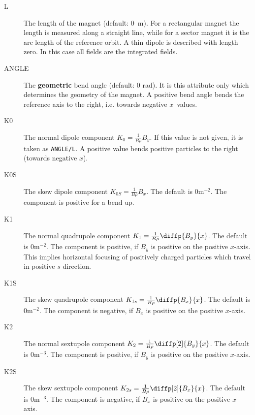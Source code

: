 \begin{description}
\item[L]
  The length of the magnet (default: 0~m).
  For a rectangular magnet the length is measured along a straight line,
  while for a sector magnet it is the arc length of the reference orbit.
  A thin dipole  is described with length zero.
  In this case all fields are the integrated fields. \\
\item[ANGLE]
  The \textbf{geometric} bend angle (default: 0 rad).
  It is this attribute only which determines the geometry of the magnet.
  A positive bend angle bends the reference axis to the right,
  i.e. towards negative $x$~values. \\
\item[K0]
  The normal dipole component
  $K_0=\frac{1}{B \rho}B_y$.
  If this value is not given, it is taken as \texttt{ANGLE/L}.
  A positive value bends positive particles to the right (towards
  negative $x$).\\
\item[K0S]
  The skew dipole component
  $K_{0S}=\frac{1}{B \rho}B_x$.
  The default is $0 \mathrm{m}^{-2}$.
  The component is positive for a bend up.\\
\item[K1]
  The normal quadrupole component
  $K_1=\frac{1}{B \rho}\diffp{B_y}{x}$.
  The default is $0 \mathrm{m}^{-2}$.
  The component is positive, if $B_y$ is positive on the positive $x$-axis.
  This implies horizontal focusing of positively charged particles which
  travel in positive $s$ direction.\\
\item[K1S]
  The skew quadrupole component
  $K_{1s}=\frac{1}{B \rho}\diffp{B_x}{x}$.
  The default is $0 \mathrm{m}^{-2}$.
  The component is negative, if $B_x$ is positive on the positive $x$-axis.\\
\item[K2]
  The normal sextupole component
  $K_2=\frac{1}{B \rho}\diffp[2]{B_y}{x}$.
  The default is $0 \mathrm{m}^{-3}$.
  The component is positive, if $B_y$ is positive on the positive $x$-axis.\\
\item[K2S]
  The skew sextupole component
  $K_{2s}=\frac{1}{B \rho}\diffp[2]{B_x}{x}$.
  The default is $0 \mathrm{m}^{-3}$.
  The component is negative, if $B_x$ is positive on the positive $x$-axis.\\

\end{description}
